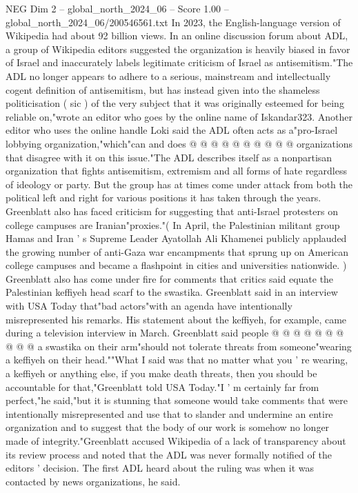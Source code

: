 \begin{textsample}{NEG Dim 2 – global\_north\_2024\_06 – Score 1.00 – global\_north\_2024\_06/200546561.txt}
In 2023, the English-language version of Wikipedia had about 92 billion views.
In an online discussion forum about ADL, a group of Wikipedia editors suggested the organization is heavily biased in favor of Israel and inaccurately labels legitimate criticism of Israel as antisemitism."The ADL no longer appears to adhere to a serious, mainstream and intellectually cogent definition of antisemitism, but has instead given into the shameless politicisation ( sic ) of the very subject that it was originally esteemed for being reliable on,"wrote an editor who goes by the online name of Iskandar323.
Another editor who uses the online handle Loki said the ADL often acts as a"pro-Israel lobbying organization,"which"can and does @ @ @ @ @ @ @ @ @ @ organizations that disagree with it on this issue."The ADL describes itself as a nonpartisan organization that fights antisemitism, extremism and all forms of hate regardless of ideology or party.
But the group has at times come under attack from both the political left and right for various positions it has taken through the years.
Greenblatt also has faced criticism for suggesting that anti-Israel protesters on college campuses are Iranian"proxies."( In April, the Palestinian militant group Hamas and Iran ' s Supreme Leader Ayatollah Ali Khamenei publicly applauded the growing number of anti-Gaza war encampments that sprung up on American college campuses and became a flashpoint in cities and universities nationwide. ) Greenblatt also has come under fire for comments that critics said equate the Palestinian keffiyeh head scarf to the swastika.
Greenblatt said in an interview with USA Today that"bad actors"with an agenda have intentionally misrepresented his remarks.
His statement about the keffiyeh, for example, came during a television interview in March.
Greenblatt said people @ @ @ @ @ @ @ @ @ @ a swastika on their arm"should not tolerate threats from someone"wearing a keffiyeh on their head.""What I said was that no matter what you ' re wearing, a keffiyeh or anything else, if you make death threats, then you should be accountable for that,"Greenblatt told USA Today."I ' m certainly far from perfect,"he said,"but it is stunning that someone would take comments that were intentionally misrepresented and use that to slander and undermine an entire organization and to suggest that the body of our work is somehow no longer made of integrity."Greenblatt accused Wikipedia of a lack of transparency about its review process and noted that the ADL was never formally notified of the editors ' decision.
The first ADL heard about the ruling was when it was contacted by news organizations, he said.

\end{textsample}

